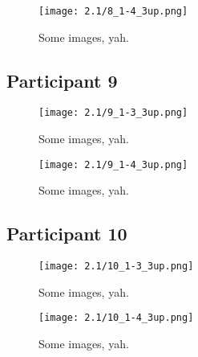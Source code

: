 \clearpage

\begin{figure}[h]
	\begin{center}
	\texttt{[image: 2.1/8\_1-4\_3up.png]}
	\caption{Some images, yah.}
	\end{center}
\end{figure}


\clearpage

\subsection{Participant 9}

\begin{figure}[h]
	\begin{center}
	\texttt{[image: 2.1/9\_1-3\_3up.png]}
	\caption{Some images, yah.}
	\end{center}
\end{figure}

\clearpage

\begin{figure}[h]
	\begin{center}
	\texttt{[image: 2.1/9\_1-4\_3up.png]}
	\caption{Some images, yah.}
	\end{center}
\end{figure}


\clearpage

\subsection{Participant 10}

\begin{figure}[h]
	\begin{center}
	\texttt{[image: 2.1/10\_1-3\_3up.png]}
	\caption{Some images, yah.}
	\end{center}
\end{figure}

\clearpage

\begin{figure}[h]
	\begin{center}
	\texttt{[image: 2.1/10\_1-4\_3up.png]}
	\caption{Some images, yah.}
	\end{center}
\end{figure}

